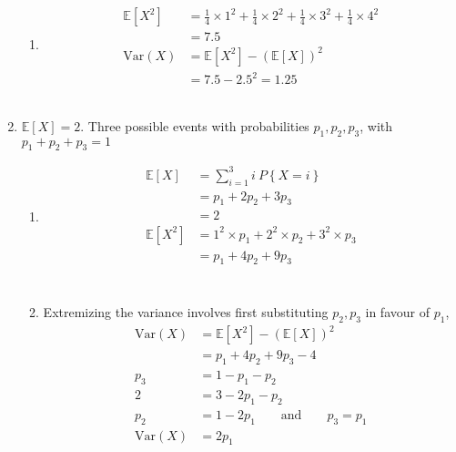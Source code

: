 \begin{enumerate}
\begin{enumerate}
			\item 	\begin{align}
				\mathbb{E}[X^2] &= \frac{1}{4} \times 1^2 + \frac{1}{4} \times 2^2 + \frac{1}{4} \times 3^2 + \frac{1}{4} \times 4^2 \nonumber \\
				&= 7.5 \\
				\mathrm{Var}(X) &= \mathbb{E}[X^2] - (\mathbb{E}[X])^2 \nonumber \\
				&= 7.5 - 2.5^2 = 1.25
			\end{align} \\
			
		\end{enumerate}
	
	
	
	\item $\mathbb{E}[X] = 2 $. Three possible events with probabilities $ p_1, p_2, p_3 $, with $ p_1 + p_2 + p_3  = 1$\\
	
		\begin{enumerate}
			
			\item 	\begin{align}
				\mathbb{E}[X] &= \sum\limits_{i = 1}^{3} i\ P\left\{X = i\right\} \nonumber \\
				&= p_1 + 2p_2 + 3p_3 \nonumber \\
				&= 2   \\
				\mathbb{E}[X^2] &= 1^2 \times p_1 + 2^2 \times p_2 + 3^2 \times p_3 \nonumber \\
				&= p_1 + 4 p_2 + 9 p_3 \nonumber \\
			\end{align} \\
			
			\item Extremizing the variance involves first substituting $ p_2, p_3 $ in favour of $ p_1 $,
			\begin{align}
				\mathrm{Var}(X) &= \mathbb{E}[X^2] - (\mathbb{E}[X])^2 \nonumber \\
				&= p_1 + 4 p_2 + 9 p_3 - 4 \nonumber \\
				p_3 &= 1 - p_1 - p_2 \nonumber \\
				2 &= 3 -2p_1 - p_2 \nonumber \\
				p_2 &= 1 - 2p_1 \qquad \text{and} \qquad p_3 = p_1 \\
				\mathrm{Var}(X) &= 2p_1
			\end{align} \\
			

\end{enumerate}
\end{enumerate}
